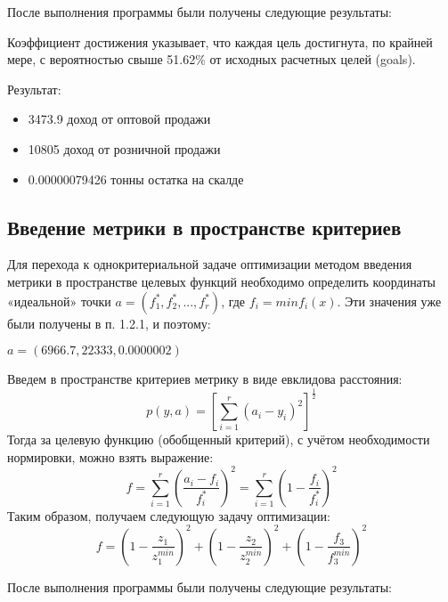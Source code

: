 \documentclass[14pt,a4paper,report]{report}
\begin{document}
После выполнения программы были получены следующие результаты:


Коэффициент достижения указывает, что каждая цель достигнута, по крайней мере, с вероятностью свыше 51.62\% от исходных расчетных целей (goals).


Результат:
\begin{itemize}
\item 3473.9 доход от оптовой продажи
\item 10805 доход от розничной продажи
\item 0.00000079426 тонны остатка на скалде
\end{itemize}






\subsection{Введение метрики в пространстве критериев}

Для перехода к однокритериальной задаче оптимизации методом введения метрики в пространстве целевых функций необходимо определить координаты «идеальной» точки $a=(f_1^*, f_2^*, ..., f_r^*)$,  где $f_i = min f_i(x)$. Эти значения
уже были получены в п. 1.2.1, и поэтому:



\begin{center}
$a = (6966.7, 22333, 0.0000002)$
\end{center}

Введем в пространстве критериев метрику в виде евклидова расстояния:
\begin{equation}
p(y, a) = [\sum_{i=1}^r(a_i-y_i)^2]^{\frac{1}{2}} 
\end{equation}
Тогда за целевую функцию (обобщенный критерий), с учётом необходимости нормировки, можно взять выражение:
\begin{equation}
f=\sum_{i=1}^r(\frac{a_i-f_i}{f_i^*})^2=\sum_{i=1}^r(1-\frac{f_i}{f_i^*})^2
\end{equation}
Таким образом, получаем следующую задачу оптимизации:
\begin{equation}
f=(1-\frac{z_1}{z_1^{min}})^2+(1-\frac{z_2}{z_2^{min}})^2+(1-\frac{f_3}{f_3^{min}})^2
\end{equation}



После выполнения программы были получены следующие результаты:

\end{document}
